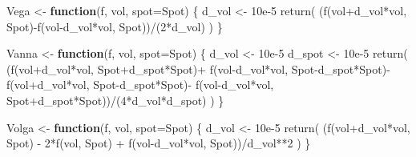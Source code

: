\documentclass[
]{article}
\newenvironment{Shaded}{\begin{snugshade}}{\end{snugshade}}
\newcommand{\AttributeTok}[1]{\textcolor[rgb]{0.77,0.63,0.00}{#1}}
\newcommand{\ControlFlowTok}[1]{\textcolor[rgb]{0.13,0.29,0.53}{\textbf{#1}}}
\newcommand{\DecValTok}[1]{\textcolor[rgb]{0.00,0.00,0.81}{#1}}
\newcommand{\FloatTok}[1]{\textcolor[rgb]{0.00,0.00,0.81}{#1}}
\newcommand{\FunctionTok}[1]{\textcolor[rgb]{0.00,0.00,0.00}{#1}}
\newcommand{\NormalTok}[1]{#1}
\newcommand{\OtherTok}[1]{\textcolor[rgb]{0.56,0.35,0.01}{#1}}
\newcommand{\SpecialCharTok}[1]{\textcolor[rgb]{0.00,0.00,0.00}{#1}}
\begin{document}
\begin{Shaded}
\begin{Highlighting}[]
\NormalTok{Vega }\OtherTok{\textless{}{-}} \ControlFlowTok{function}\NormalTok{(f, vol, }\AttributeTok{spot=}\NormalTok{Spot) \{}
\NormalTok{  d\_vol }\OtherTok{\textless{}{-}} \FloatTok{10e{-}5}
  \FunctionTok{return}\NormalTok{( (}\FunctionTok{f}\NormalTok{(vol}\SpecialCharTok{+}\NormalTok{d\_vol}\SpecialCharTok{*}\NormalTok{vol, Spot)}\SpecialCharTok{{-}}\FunctionTok{f}\NormalTok{(vol}\SpecialCharTok{{-}}\NormalTok{d\_vol}\SpecialCharTok{*}\NormalTok{vol, Spot))}\SpecialCharTok{/}\NormalTok{(}\DecValTok{2}\SpecialCharTok{*}\NormalTok{d\_vol) )}
\NormalTok{\}}

\NormalTok{Vanna }\OtherTok{\textless{}{-}} \ControlFlowTok{function}\NormalTok{(f, vol, }\AttributeTok{spot=}\NormalTok{Spot) \{}
\NormalTok{  d\_vol }\OtherTok{\textless{}{-}} \FloatTok{10e{-}5}
\NormalTok{  d\_spot }\OtherTok{\textless{}{-}} \FloatTok{10e{-}5}
  \FunctionTok{return}\NormalTok{( (}\FunctionTok{f}\NormalTok{(vol}\SpecialCharTok{+}\NormalTok{d\_vol}\SpecialCharTok{*}\NormalTok{vol, Spot}\SpecialCharTok{+}\NormalTok{d\_spot}\SpecialCharTok{*}\NormalTok{Spot)}\SpecialCharTok{+}
           \FunctionTok{f}\NormalTok{(vol}\SpecialCharTok{{-}}\NormalTok{d\_vol}\SpecialCharTok{*}\NormalTok{vol, Spot}\SpecialCharTok{{-}}\NormalTok{d\_spot}\SpecialCharTok{*}\NormalTok{Spot)}\SpecialCharTok{{-}}
           \FunctionTok{f}\NormalTok{(vol}\SpecialCharTok{+}\NormalTok{d\_vol}\SpecialCharTok{*}\NormalTok{vol, Spot}\SpecialCharTok{{-}}\NormalTok{d\_spot}\SpecialCharTok{*}\NormalTok{Spot)}\SpecialCharTok{{-}}
           \FunctionTok{f}\NormalTok{(vol}\SpecialCharTok{{-}}\NormalTok{d\_vol}\SpecialCharTok{*}\NormalTok{vol, Spot}\SpecialCharTok{+}\NormalTok{d\_spot}\SpecialCharTok{*}\NormalTok{Spot))}\SpecialCharTok{/}\NormalTok{(}\DecValTok{4}\SpecialCharTok{*}\NormalTok{d\_vol}\SpecialCharTok{*}\NormalTok{d\_spot) )}
\NormalTok{\}}
  
\NormalTok{Volga }\OtherTok{\textless{}{-}} \ControlFlowTok{function}\NormalTok{(f, vol, }\AttributeTok{spot=}\NormalTok{Spot) \{}
\NormalTok{  d\_vol }\OtherTok{\textless{}{-}} \FloatTok{10e{-}5}
  \FunctionTok{return}\NormalTok{( (}\FunctionTok{f}\NormalTok{(vol}\SpecialCharTok{+}\NormalTok{d\_vol}\SpecialCharTok{*}\NormalTok{vol, Spot) }\SpecialCharTok{{-}} \DecValTok{2}\SpecialCharTok{*}\FunctionTok{f}\NormalTok{(vol, Spot) }\SpecialCharTok{+} \FunctionTok{f}\NormalTok{(vol}\SpecialCharTok{{-}}\NormalTok{d\_vol}\SpecialCharTok{*}\NormalTok{vol, Spot))}\SpecialCharTok{/}\NormalTok{d\_vol}\SpecialCharTok{**}\DecValTok{2}\NormalTok{ )}
\NormalTok{  \}}
\end{Highlighting}
\end{Shaded}
\end{document}
